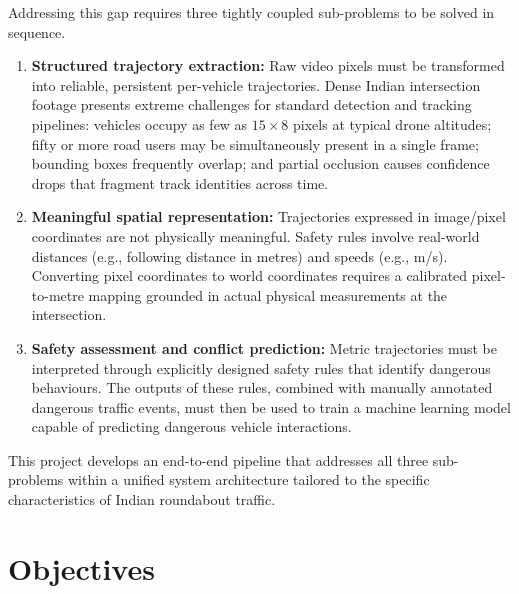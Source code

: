 \documentclass[12pt,a4paper]{report}
\begin{document}
Addressing this gap requires three tightly coupled sub-problems to be solved in sequence.

\begin{enumerate}
    \item \textbf{Structured trajectory extraction:}
          Raw video pixels must be transformed into reliable, persistent per-vehicle
          trajectories.  Dense Indian intersection footage presents extreme challenges for
          standard detection and tracking pipelines: vehicles occupy as few as $15 \times 8$
          pixels at typical drone altitudes; fifty or more road users may be simultaneously
          present in a single frame; bounding boxes frequently overlap; and partial occlusion
          causes confidence drops that fragment track identities across time.

    \item \textbf{Meaningful spatial representation:}
          Trajectories expressed in image/pixel coordinates are not physically meaningful.
          Safety rules involve real-world distances (e.g., following distance in metres) and
          speeds (e.g., m/s).  Converting pixel coordinates to world coordinates requires a
          calibrated pixel-to-metre mapping grounded in actual physical measurements at the
          intersection.

    \item \textbf{Safety assessment and conflict prediction:}
          Metric trajectories must be interpreted through explicitly designed safety rules
          that identify dangerous behaviours.  The outputs of these rules, combined with
          manually annotated dangerous traffic events, must then be used to train a machine
          learning model capable of predicting dangerous vehicle interactions.
\end{enumerate}

This project develops an end-to-end pipeline that addresses all three sub-problems within a
unified system architecture tailored to the specific characteristics of Indian roundabout
traffic.

\section{Objectives}
\end{document}
